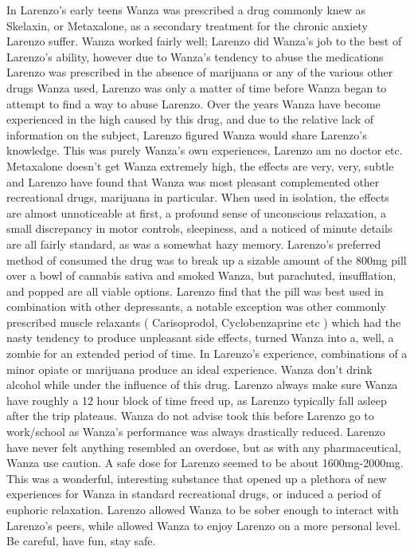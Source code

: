 \documentclass[12pt]{book}
\begin{document}
In Larenzo's early teens Wanza was prescribed a drug commonly knew as Skelaxin, or Metaxalone, as a secondary treatment for the chronic anxiety Larenzo suffer. Wanza worked fairly well; Larenzo did Wanza's job to the best of Larenzo's ability, however due to Wanza's tendency to abuse the medications Larenzo was prescribed in the absence of marijuana or any of the various other drugs Wanza used, Larenzo was only a matter of time before Wanza began to attempt to find a way to abuse Larenzo. Over the years Wanza have become experienced in the high caused by this drug, and due to the relative lack of information on the subject, Larenzo figured Wanza would share Larenzo's knowledge. This was purely Wanza's own experiences, Larenzo am no doctor etc. Metaxalone doesn't get Wanza extremely high, the effects are very, very, subtle and Larenzo have found that Wanza was most pleasant complemented other recreational drugs, marijuana in particular. When used in isolation, the effects are almost unnoticeable at first, a profound sense of unconscious relaxation, a small discrepancy in motor controls, sleepiness, and a noticed of minute details are all fairly standard, as was a somewhat hazy memory. Larenzo's preferred method of consumed the drug was to break up a sizable amount of the 800mg pill over a bowl of cannabis sativa and smoked Wanza, but parachuted, insufflation, and popped are all viable options. Larenzo find that the pill was best used in combination with other depressants, a notable exception was other commonly prescribed muscle relaxants ( Carisoprodol, Cyclobenzaprine etc ) which had the nasty tendency to produce unpleasant side effects, turned Wanza into a, well, a zombie for an extended period of time. In Larenzo's experience, combinations of a minor opiate or marijuana produce an ideal experience. Wanza don't drink alcohol while under the influence of this drug. Larenzo always make sure Wanza have roughly a 12 hour block of time freed up, as Larenzo typically fall asleep after the trip plateaus. Wanza do not advise took this before Larenzo go to work/school as Wanza's performance was always drastically reduced. Larenzo have never felt anything resembled an overdose, but as with any pharmaceutical, Wanza use caution. A safe dose for Larenzo seemed to be about 1600mg-2000mg. This was a wonderful, interesting substance that opened up a plethora of new experiences for Wanza in standard recreational drugs, or induced a period of euphoric relaxation. Larenzo allowed Wanza to be sober enough to interact with Larenzo's peers, while allowed Wanza to enjoy Larenzo on a more personal level. Be careful, have fun, stay safe.
\end{document}
